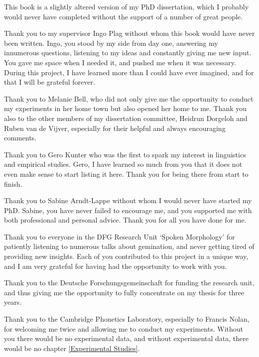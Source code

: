 \addchap{\lsAcknowledgementTitle} 

\vspace*{-0.4cm}
This book is a slightly altered version of my PhD dissertation, which I probably would never have completed without the support of a number of great people.

Thank you to my supervisor Ingo Plag without whom this book would have never been written. Ingo, you stood by my side from day one, answering my innumerous questions,  listening to my ideas and constantly giving me new input. You gave me space when I needed it, and pushed me when it was necessary. During this project, I have learned more than I could have ever imagined, and for that I will be grateful forever.

Thank you to Melanie Bell, who did not only give me the opportunity to conduct my experiments in her home town but also opened her home to me. 
Thank you also to the other members of my dissertation committee, Heidrun Dorgeloh and Ruben van de Vijver, especially for their helpful and always encouraging comments. 

Thank you to Gero Kunter who was the first to spark my interest in linguistics and empirical studies. Gero, I have learned so much from you that it does not even make sense to start listing it here. Thank you for being there from start to finish.

Thank you to Sabine Arndt-Lappe without whom I would never have started my PhD. Sabine, you have never failed to encourage me, and you supported me with both professional and personal advice. Thank you for all you have done for me.

Thank you to everyone in the DFG Research Unit `Spoken Morphology' for patiently listening to numerous talks about gemination, and never getting tired of providing new insights. Each of you contributed to this project in a unique way, and I am very grateful for having had the opportunity to work with you.

Thank you to the Deutsche Forschungsgemeinschaft for funding the research unit, and thus giving me the opportunity to fully concentrate on my thesis for three years.

Thank you to the Cambridge Phonetics Laboratory, especially to Francis Nolan, for welcoming me twice and allowing me to conduct my experiments. Without you there would be no experimental data, and without experimental data, there would be no chapter \ref{Experimental Studies}.


